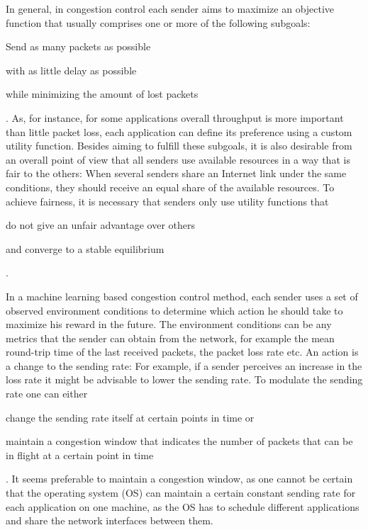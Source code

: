 \documentclass[newfonts=false,format=sigconf,10pt,letterpaper]{acmart}
\begin{document}
In general, in congestion control each sender aims to maximize an objective function that usually comprises one or more of the following subgoals:
\begin{enumerate*}
\item Send as many packets as possible
\item with as little delay as possible
\item while minimizing the amount of lost packets
\end{enumerate*}. 
As, for instance, for some applications overall throughput is more important than little packet loss, each application can define its preference using a custom utility function. Besides aiming to fulfill these subgoals, it is also desirable from an overall point of view that all senders use available resources in a way that is fair to the others: When several senders share an Internet link under the same conditions, they should receive an equal share of the available resources. To achieve fairness, it is necessary that senders only use utility functions that 
\begin{enumerate*}
\item do not give an unfair advantage over others
\item and converge to a stable equilibrium
\end{enumerate*}.

In a machine learning based congestion control method, each sender uses a set of observed environment conditions to determine which action he should take to maximize his reward in the future. The environment conditions can be any metrics that the sender can obtain from the network, for example the mean round-trip time of the last received packets, the packet loss rate etc. An action is a change to the sending rate: For example, if a sender perceives an increase in the loss rate it might be advisable to lower the sending rate. To modulate the sending rate one can  either
\begin{enumerate*}
\item change the sending rate itself at certain points in time or
\item maintain a congestion window that indicates the number of packets that can be in flight at a certain point in time
\end{enumerate*}. It seems preferable to maintain a congestion window, as one cannot be certain that the operating system (OS) can maintain a certain constant sending rate for each application on one machine, as the OS has to schedule different applications and share the network interfaces between them. 
\end{document}
